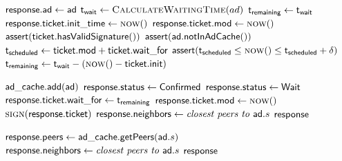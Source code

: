 \begin{algorithm}[]%
    \caption{%
        Admission algorithm run by registrars.
    }%
    \label{alg:register}%
    \begin{algorithmic}[1]%
        \footnotesize%
            \State $\mathsf{response.ad} \gets \mathsf{ad}$
            \State $\algvar{t_{wait}} \gets \Call{CalculateWaitingTime}{ad}$
                \State $\mathsf{t_{remaining}} \gets \mathsf{t_{wait}}$
                \State $\algvar{response.ticket.init\_time} \gets \Call{now}$
                \State $\algvar{response.ticket.mod} \gets \Call{now}{ }$
            \Else
                \State $ \mathsf{assert(ticket.hasValidSignature ())} $
                \State $ \mathsf{assert(ad.notInAdCache ())} $
                \State $\mathsf{t_{scheduled}} \gets \mathsf{ticket.mod} + \mathsf{ticket.wait\_for}$
                \State $ \algvar{assert}(\algvar{t_{scheduled}} \le \Call{now}{ } \le \algvar{t_{scheduled}} + \delta) $ \label{alg:registrer_delta}
                \State $\algvar{t_{remaining}} \gets \algvar{t_{wait}}  - (\Call{now}{ } - \algvar{ticket.init})$
            \EndIf

            \label{alg:registrer_if}
                \State $\mathsf{ad\_cache.add}({\mathsf{ad}})$
                \State $\mathsf{response.status} \gets \mathsf{Confirmed}$
            \Else
                \State $\mathsf{response.status} \gets \mathsf{Wait}$
                \State $\mathsf{response.ticket.wait\_for} \gets \mathsf{t_{remaining}}$
                \State $\algvar{response.ticket.mod} \gets \Call{now}{ }$
                \State $\Call{sign}{\algvar{response.ticket}}$
            \EndIf
            \State $\mathsf{response.neighbors} \gets \textit{closest peers to } \mathsf{ad.}s$
            \State \Return $\mathsf{response}$
        \EndProcedure
    \end{algorithmic}%
\end{algorithm}%

\begin{algorithm}[]%
    \caption{%
        Lookup response algorithm run by registrars.
    }%
    \label{alg:registrar_register}%
    \begin{algorithmic}[1]%
        \footnotesize%
            \State $\mathsf{response.peers} \gets \mathsf{ad\_cache.getPeers}(\mathsf{ad.}s)$
            \State $\mathsf{response.neighbors} \gets \textit{closest peers to } \mathsf{ad.}s$
            \State \Return $\mathsf{response}$
        \EndProcedure
    \end{algorithmic}%
\end{algorithm}%
